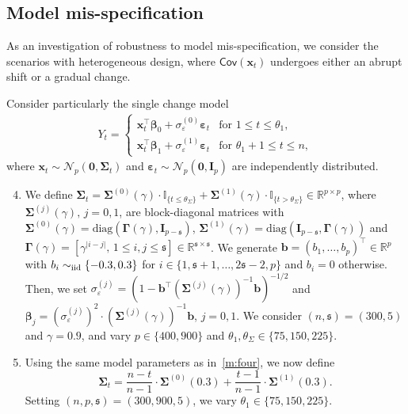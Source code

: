 \documentclass[11pt, a4paper]{article}
\newcommand{\mbf}{\mathbf}
\newcommand{\mc}{\mathcal}
\newcommand{\vep}{\varepsilon}
\renewcommand{\l}{\left}
\renewcommand{\r}{\right}
\newcommand{\cp}{\theta}
\newcommand{\Cov}[0]{\mathsf{Cov}}
\newcommand{\R}{\mathbb{R}}
\newcommand{\iid}{\text{\upshape iid}}
\theoremstyle{definition}
\theoremstyle{definition}
\theoremstyle{definition}
\theoremstyle{definition}
\theoremstyle{definition}
\theoremstyle{remark}
\theoremstyle{definition}
\theoremstyle{definition}
\theoremstyle{definition}
\begin{document}
\clearpage

\subsection{{Model mis-specification}}
\label{sec:sim:mask}
As an investigation of robustness to model mis-specification, we consider the scenarios with heterogeneous design, where $\Cov(\mbf x_t)$ undergoes either an abrupt shift or a gradual change. 

Consider particularly the single change model 
\begin{align*}
Y_t = \l\{ \begin{array}{ll}
\mbf x_t^\top \bm\beta_0 + \sigma^{(0)}_\vep \bm\vep_t & \text{for $1 \le t \le \cp_1$},  \\
\mbf x_t^\top \bm\beta_1 + \sigma^{(1)}_\vep \bm\vep_t & \text{for $\cp_1 + 1 \le t \le n$}, 
\end{array}\r.
\end{align*}
where $\mbf x_t \sim \mc N_p(\mbf 0, \bm\Sigma_t)$ and $\bm\vep_t \sim \mc N_p(\mbf 0, \mbf I_p)$ are independently distributed.
\begin{enumerate}[label = (M\arabic*)]
\setcounter{enumi}{3}
\item \label{m:four} We define
$\bm\Sigma_t = \bm\Sigma^{(0)}(\gamma) \cdot \mathbb{I}_{\{t \le \cp_\Sigma\}} + \bm\Sigma^{(1)}(\gamma) \cdot \mathbb{I}_{\{t > \cp_\Sigma\}} \in \R^{p \times p}$, where $\bm\Sigma^{(j)}(\gamma), \, j = 0, 1$, are block-diagonal matrices with $\bm\Sigma^{(0)}(\gamma) = \text{diag}(\bm\Gamma(\gamma), \mbf I_{p - \mathfrak{s}})$, $\bm\Sigma^{(1)}(\gamma) = \text{diag}(\mbf I_{p - \mathfrak{s}}, \bm\Gamma(\gamma))$ and $\bm\Gamma(\gamma) = [\gamma^{\vert i - j \vert}, \, 1 \le i, j \le \mathfrak{s}] \in \R^{\mathfrak{s} \times \mathfrak{s}}$.
We generate $\mbf b = (b_1, \ldots, b_p)^\top \in \R^p$ with $b_i \sim_{\iid} \{-0.3, 0.3\}$ for $i \in \{1, \mathfrak{s} + 1, \ldots, 2\mathfrak{s} - 2, p\}$ and $b_i = 0$ otherwise.
Then, we set $\sigma^{(j)}_\vep = (1 - \mbf b^\top (\bm\Sigma^{(j)}(\gamma))^{-1} \mbf b)^{-1/2}$ and $\bm\beta_j = (\sigma^{(j)}_\vep)^2 \cdot (\bm\Sigma^{(j)}(\gamma))^{-1} \mbf b$, $j = 0, 1$.
We consider $(n, \mathfrak{s}) = (300, 5)$ and $\gamma = 0.9$, and vary $p \in \{400, 900\}$ and $\cp_1, \cp_\Sigma \in \{75, 150, 225\}$.

\item \label{m:five} Using the same model parameters as in~\ref{m:four}, we now define \[\bm\Sigma_t = \frac{n - t}{n - 1}\cdot \bm\Sigma^{(0)}(0.3) +\frac{t - 1}{n - 1} \cdot \bm\Sigma^{(1)}(0.3).\]
Setting $(n, p, \mathfrak{s}) = (300, 900, 5)$, we vary $\cp_1 \in \{75, 150, 225\}$.
\end{enumerate}
\end{document}
